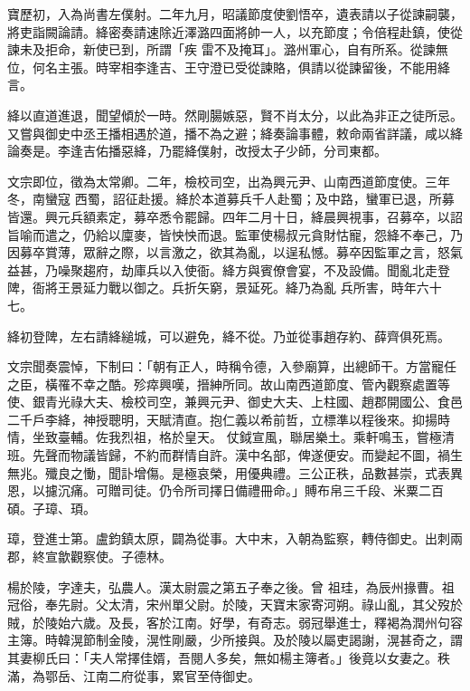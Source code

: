 \begin{pinyinscope}
 寶歷初，入為尚書左僕射。二年九月，昭議節度使劉悟卒，遺表請以子從諫嗣襲，將吏詣闕論請。絳密奏請速除近澤潞四面將帥一人，以充節度；令倍程赴鎮，使從諫未及拒命，新使已到，所謂「疾
 雷不及掩耳」。潞州軍心，自有所系。從諫無位，何名主張。時宰相李逢吉、王守澄已受從諫賂，俱請以從諫留後，不能用絳言。



 絳以直道進退，聞望傾於一時。然剛腸嫉惡，賢不肖太分，以此為非正之徒所忌。又嘗與御史中丞王播相遇於道，播不為之避；絳奏論事體，敕命兩省詳議，咸以絳論奏是。李逢吉佑播惡絳，乃罷絳僕射，改授太子少師，分司東都。



 文宗即位，徵為太常卿。二年，檢校司空，出為興元尹、山南西道節度使。三年冬，南蠻寇
 西蜀，詔征赴援。絳於本道募兵千人赴蜀；及中路，蠻軍已退，所募皆還。興元兵額素定，募卒悉令罷歸。四年二月十日，絳晨興視事，召募卒，以詔旨喻而遣之，仍給以廩麥，皆怏怏而退。監軍使楊叔元貪財怙寵，怨絳不奉己，乃因募卒賞薄，眾辭之際，以言激之，欲其為亂，以逞私憾。募卒因監軍之言，怒氣益甚，乃噪聚趨府，劫庫兵以入使衙。絳方與賓僚會宴，不及設備。聞亂北走登陴，衙將王景延力戰以御之。兵折矢窮，景延死。絳乃為亂
 兵所害，時年六十七。



 絳初登陴，左右請絳縋城，可以避免，絳不從。乃並從事趙存約、薛齊俱死焉。



 文宗聞奏震悼，下制曰：「朝有正人，時稱令德，入參廟算，出總師干。方當寵任之臣，橫罹不幸之酷。殄瘁興嘆，搢紳所同。故山南西道節度、管內觀察處置等使、銀青光祿大夫、檢校司空，兼興元尹、御史大夫、上柱國、趙郡開國公、食邑二千戶李絳，神授聰明，天賦清直。抱仁義以希前哲，立標準以程後來。抑揚時情，坐致臺輔。佐我烈祖，格於皇天。
 仗鉞宣風，聯居樂土。乘軒鳴玉，嘗極清班。先聲而物議皆歸，不約而群情自許。漢中名部，俾遂便安。而變起不圖，禍生無兆。殲良之慟，聞訃增傷。是極哀榮，用優典禮。三公正秩，品數甚崇，式表異恩，以攄沉痛。可贈司徒。仍令所司擇日備禮冊命。」賻布帛三千段、米粟二百碩。子璋、頊。



 璋，登進士第。盧鈞鎮太原，闢為從事。大中末，入朝為監察，轉侍御史。出刺兩郡，終宣歙觀察使。子德林。



 楊於陵，字達夫，弘農人。漢太尉震之第五子奉之後。曾
 祖珪，為辰州掾曹。祖冠俗，奉先尉。父太清，宋州單父尉。於陵，天寶末家寄河朔。祿山亂，其父歿於賊，於陵始六歲。及長，客於江南。好學，有奇志。弱冠舉進士，釋褐為潤州句容主簿。時韓滉節制金陵，滉性剛嚴，少所接與。及於陵以屬吏謁謝，滉甚奇之，謂其妻柳氏曰：「夫人常擇佳婿，吾閱人多矣，無如楊主簿者。」後竟以女妻之。秩滿，為鄂岳、江南二府從事，累官至侍御史。




\end{pinyinscope}
